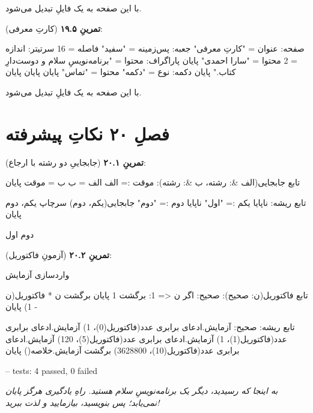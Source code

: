 با  این صفحه به یک فایلِ  تبدیل می‌شود.

\textbf{تمرینِ ۱۹.۵} (کارتِ معرفی):
\begin{salamfa}
صفحه:
    عنوان = "کارتِ معرفی"
    جعبه:
        پس‌زمینه = "سفید"
        فاصله = 16
        سرتیتر: اندازه = 2 محتوا = "سارا احمدی" پایان
        پاراگراف: محتوا = "برنامه‌نویسِ سلام و دوست‌دارِ کتاب." پایان
        دکمه: نوع = "دکمه" محتوا = "تماس" پایان
    پایان
پایان
\end{salamfa}

با  این صفحه به یک فایلِ  تبدیل می‌شود.

\section*{فصلِ ۲۰ نکاتِ پیشرفته}
{}

\textbf{تمرینِ ۲۰.۱} (جابجاییِ دو رشته با ارجاع):
\begin{salamfa}
تابع جابجایی(الف &: رشته، ب &: رشته):
    موقت := الف
    الف = ب
    ب = موقت
پایان

تابع ریشه:
    ناپایا یکم := "اول"
    ناپایا دوم := "دوم"
    جابجایی(یکم، دوم)
    سرچاپ یکم، دوم
پایان
\end{salamfa}

\begin{progoutfa}
دوم اول
\end{progoutfa}

\textbf{تمرینِ ۲۰.۲} (آزمونِ فاکتوریل):
\begin{salamfa}
واردسازی آزمایش

تابع فاکتوریل(ن: صحیح): صحیح:
    اگر ن <= 1:
        برگشت 1
    پایان
    برگشت ن * فاکتوریل(ن - 1)
پایان

تابع ریشه: صحیح:
    آزمایش.ادعای برابری عدد(فاکتوریل(0)، 1)
    آزمایش.ادعای برابری عدد(فاکتوریل(1)، 1)
    آزمایش.ادعای برابری عدد(فاکتوریل(5)، 120)
    آزمایش.ادعای برابری عدد(فاکتوریل(10)، 3628800)
    برگشت آزمایش.خلاصه()
پایان
\end{salamfa}

\begin{progoutfa}
--
tests: 4 passed, 0 failed
\end{progoutfa}

\vspace{1cm}
\begin{center}
\emph{به اینجا که رسیدید، دیگر یک برنامه‌نویسِ سلام هستید. راهِ یادگیری هرگز
پایان نمی‌یابد؛ پس بنویسید، بیازمایید و لذت ببرید!}
\end{center}
